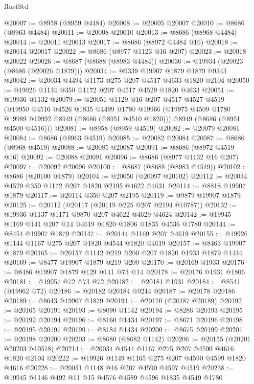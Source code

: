\begin{lexlean}{RustStd}
\begin{coremodule}
@20007 := @8958 (@8959 @4484)
@20008 := @20005 @20007
@20010 := @8686 (@8963 @4484)
@20011 := @20008 @20010
@20013 := @8686 (@8968 @4484)
@20014 := @20011 @20013
@20017 := @8686 (@8972 @4484 @16)
@20018 := @20014 @20017
@20022 := @8686 (@8977 @1123 @16 @207)
@20023 := @20018 @20022
@20026 := @8687 (@8688 (@8983 @4484))
@20030 := @19934 (@20023 (@8686 (@20026 @1879)))
@20034 := @9339 @19907 @1879 @1879 @9343
@20042 := @20034 @4494 @1173 @275 @207 @4517 @4633 @1820 @2104
@20050 := @19926 @1134 @350 @1172 @207 @4517 @4529 @1820 @4633
@20051 := @19936 @1132
@20079 := @20051
    @1129
    @16
    @207
    @4517
    @4527
    @4519
    (@19950
      @4516
      @4526
      @1835
      @4499
      @1780
      @19966
      (@19975 @4509 @1780 @19989 @19992 @8949 (@8686 (@8951 @4510 @1820)))
      @8949
      (@8686 (@8951 @4500 @4516)))
@20081 := @8958 (@8959 @4519)
@20082 := @20079 @20081
@20084 := @8686 (@8963 @4519)
@20085 := @20082 @20084
@20087 := @8686 (@8968 @4519)
@20088 := @20085 @20087
@20091 := @8686 (@8972 @4519 @16)
@20092 := @20088 @20091
@20096 := @8686 (@8977 @1132 @16 @207)
@20097 := @20092 @20096
@20100 := @8687 (@8688 (@8983 @4519))
@20102 := @8686 (@20100 @1879)
@20104 := @20050 (@20097 @20102)
@20112 := @20034 @4529 @350 @1172 @207 @1820 @2195 @4622 @4631
@20114 := @8818 @19907 @1879
@20117 := @20114 @350 @207 @2195
@20119 := @9879 @19907 @1879
@20125 := @20112 (@20117 (@20119 @225 @207 @2194 @10787))
@20132 := @19936 @1137 @1171 @9870 @207 @4622 @4629 @4624
@20142 := @19945 @1169 @141 @207 @14 @4619 @1820 @1806 @1835 @4536 @1780
@20144 := @8454 @19907 @1879
@20147 := @20144 @1169 @207 @4619
@20155 := @19926 @1144 @1167 @275 @207 @1820 @4544 @1820 @4619
@20157 := @8463 @19907 @1879
@20165 := @20157 @1142 @219 @200 @207 @1820 @1933 @1879 @1434
@20169 := @8477 @19907 @1879 @219 @200
@20170 := @20169 @1933
@20176 := @8486 @19907 @1879 @129 @141 @73 @14
@20178 := @20176 @1931 @1806
@20181 := @19957 @72 @73 @72
@20182 := @20181 @1931
@20184 := @8541 (@19962 @72)
@20186 := @20182 @20184 @9244
@20187 := @20178 @20186
@20189 := @8643 @19907 @1879
@20191 := @20170 (@20187 @20189)
@20192 := @20165 @20191
@20193 := @8090 @1142
@20194 := @8286 @20193
@20195 := @20192 @20194
@20196 := @8160 @1434
@20197 := @8671 @20196
@20198 := @20195 @20197
@20199 := @8184 @1434
@20200 := @8675 @20199
@20201 := @20198 @20200
@20203 := @8680 (@8682 @1142)
@20206 := @20155 (@20201 @20203 @10518)
@20214 := @20034 @4544 @1167 @275 @207 @4590 @4616 @1820 @2104
@20222 := @19926 @1149 @1165 @275 @207 @4590 @4599 @1820 @4616
@20228 := @20051 @1148 @16 @207 @4590 @4597 @4519
@20238 := @19945 @1146 @492 @11 @15 @4576 @4589 @4596 @1835 @4549 @1780

\end{coremodule}
\end{lexlean}
